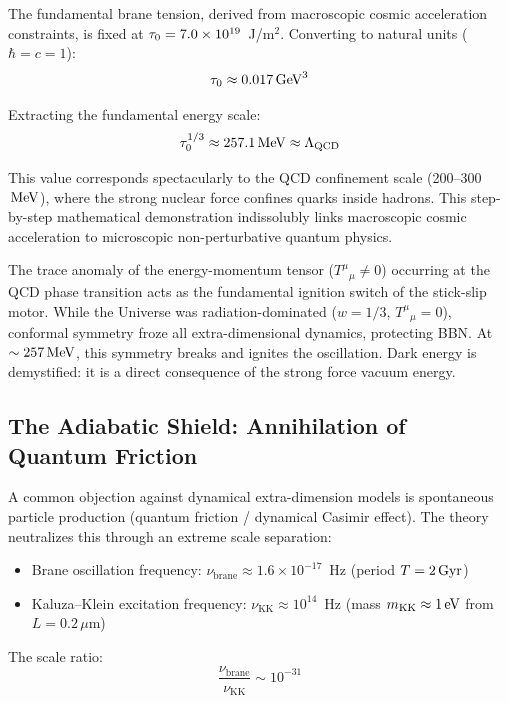 The fundamental brane tension, derived from macroscopic cosmic acceleration constraints, is fixed at $\tau_0 = 7.0 \times 10^{19}$~J/m$^2$. Converting to natural units ($\hbar = c = 1$):
\begin{equation}
\tau_0 \approx 0.017\,\text{GeV}^3
\end{equation}

Extracting the fundamental energy scale:
\begin{equation}
\tau_0^{1/3} \approx 257.1\,\text{MeV} \approx \Lambda_\text{QCD}
\end{equation}

This value corresponds spectacularly to the QCD confinement scale (200--300$\,\text{MeV}$), where the strong nuclear force confines quarks inside hadrons. This step-by-step mathematical demonstration indissolubly links macroscopic cosmic acceleration to microscopic non-perturbative quantum physics.

The trace anomaly of the energy-momentum tensor ($T^\mu{}_\mu \neq 0$) occurring at the QCD phase transition acts as the fundamental ignition switch of the stick-slip motor. While the Universe was radiation-dominated ($w = 1/3$, $T^\mu{}_\mu = 0$), conformal symmetry froze all extra-dimensional dynamics, protecting BBN. At $\sim 257\,\text{MeV}$, this symmetry breaks and ignites the oscillation. Dark energy is demystified: it is a direct consequence of the strong force vacuum energy.

\subsection{The Adiabatic Shield: Annihilation of Quantum Friction}
\label{sec:adiabatic_shield}

A common objection against dynamical extra-dimension models is spontaneous particle production (quantum friction / dynamical Casimir effect). The theory neutralizes this through an extreme scale separation:

\begin{itemize}
  \item Brane oscillation frequency: $\nu_\text{brane} \approx 1.6 \times 10^{-17}$~Hz (period $T = 2\,\text{Gyr}$)
  \item Kaluza--Klein excitation frequency: $\nu_\text{KK} \approx 10^{14}$~Hz (mass $m_\text{KK} \approx 1\,\text{eV}$ from $L = 0.2\,\mu$m)
\end{itemize}

The scale ratio:
\begin{equation}
\frac{\nu_\text{brane}}{\nu_\text{KK}} \sim 10^{-31}
\end{equation}

